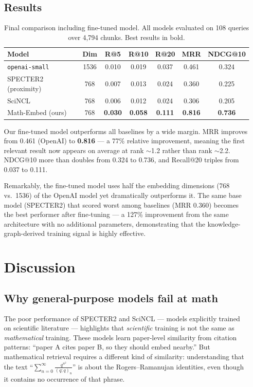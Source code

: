 \documentclass[11pt,a4paper]{article}
\begin{document}
\subsection{Results}

\begin{table}[h]
\centering
\caption{Final comparison including fine-tuned model. All models evaluated
on 108 queries over 4,794 chunks. Best results in bold.}
\label{tab:final}
\begin{tabular}{lcccccc}
\toprule
Model & Dim & R@5 & R@10 & R@20 & MRR & NDCG@10 \\
\midrule
\texttt{openai-small} & 1536 & 0.010 & 0.019 & 0.037 & 0.461 & 0.324 \\
SPECTER2 (proximity) & 768 & 0.007 & 0.013 & 0.024 & 0.360 & 0.225 \\
SciNCL & 768 & 0.006 & 0.012 & 0.024 & 0.306 & 0.205 \\
\midrule
Math-Embed (ours) & 768 & \textbf{0.030} & \textbf{0.058} & \textbf{0.111} & \textbf{0.816} & \textbf{0.736} \\
\bottomrule
\end{tabular}
\end{table}

Our fine-tuned model outperforms all baselines by a wide margin.
MRR improves from 0.461 (OpenAI) to \textbf{0.816} --- a 77\% relative
improvement, meaning the first relevant result now appears on average at
rank $\sim$1.2 rather than rank $\sim$2.2. NDCG@10 more than doubles from
0.324 to 0.736, and Recall@20 triples from 0.037 to 0.111.

Remarkably, the fine-tuned model uses half the embedding dimensions (768
vs.\ 1536) of the OpenAI model yet dramatically outperforms it. The same
base model (SPECTER2) that scored worst among baselines (MRR 0.360) becomes
the best performer after fine-tuning --- a 127\% improvement from the same
architecture with no additional parameters, demonstrating that the
knowledge-graph-derived training signal is highly effective.


\section{Discussion}

\subsection{Why general-purpose models fail at math}

The poor performance of SPECTER2 and SciNCL --- models explicitly trained on
scientific literature --- highlights that \emph{scientific} training is not
the same as \emph{mathematical} training. These models learn paper-level
similarity from citation patterns: ``paper A cites paper B, so they should
embed nearby.'' But mathematical retrieval requires a different kind of
similarity: understanding that the text ``$\sum_{n=0}^{\infty}
\frac{q^{n^2}}{(q;q)_n}$'' is about the Rogers--Ramanujan identities, even
though it contains no occurrence of that phrase.
\end{document}
